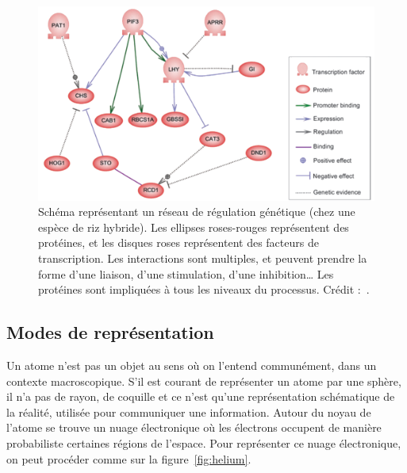 	\begin{figure}[H]
		\centering
		\includegraphics[width=\textwidth]{figures/ch1/regulation}
		\caption[Réseau de régulation.]{Schéma représentant un réseau de régulation génétique (chez une espèce de riz hybride). Les ellipses roses-rouges représentent des protéines, et les disques roses représentent des facteurs de transcription\footnotemark. Les interactions sont multiples, et peuvent prendre la forme d'une liaison, d'une stimulation, d'une inhibition\ldots{} Les protéines sont impliquées à tous les niveaux du processus. Crédit :~\cite{song2010comparative}.}
		\label{fig:regulation}
	\end{figure}
	
	
	
	\subsection{Modes de représentation}
	Un atome n'est pas un objet au sens où on l'entend communément, dans un contexte macroscopique. S'il est courant de représenter un atome par une sphère, il n'a pas de rayon, de \og coquille \fg{} et ce n'est qu'une représentation schématique de la réalité, utilisée pour communiquer une information. Autour du noyau de l'atome se trouve un nuage électronique où les électrons occupent de manière probabiliste certaines régions de l'espace. Pour représenter ce nuage électronique, on peut procéder comme sur la figure~\ref{fig:helium}.
	
